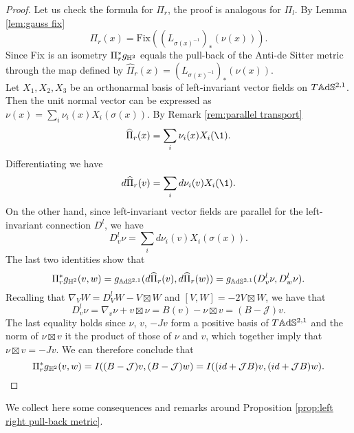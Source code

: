\begin{proof}
    Let us check the formula for $\Pi_r$, the proof is analogous for $\Pi_l$. By Lemma \ref{lem:gauss fix}
    \[
        \Pi_r(x) = \text{Fix}((L_{\sigma(x)^{-1}})_*(\nu(x))).
    \]
    Since Fix is an isometry $\Pi^*_r g_{\mathbb{H}^2}$ equals the pull-back of the Anti-de Sitter metric through the map defined by $\widehat{\Pi}_r(x) = (L_{\sigma(x)^{-1}})_*(\nu(x))$.\\
    Let $X_1, X_2, X_3$ be an orthonarmal basis of left-invariant vector fields on $T\mathbb{A}\mathrm{d}\mathbb{S}^{2,1}$. Then the unit normal vector can be expressed as $\nu(x) = \sum_i \nu_i(x) X_i (\sigma(x))$. By Remark \ref{rem:parallel transport}
    \[
        \widehat{\Pi}_r(x) = \sum_i \nu_i(x) X_i (\1).
    \]
    Differentiating we have
    \[
        d \widehat{\Pi}_r(v) = \sum_i  d \nu_i(v) X_i (\1).
    \]
    On the other hand, since left-invariant vector fields are parallel for the left-invariant connection $D^l$, we have
    \[
        D^l_v \nu = \sum_i  d \nu_i(v) X_i (\sigma(x)).
    \]
    The last two identities show that
    \[
        \Pi_r^* g_{\mathbb{H}^2}(v,w) = g_{\mathbb{A}\mathrm{d}\mathbb{S}^{2,1}}(d \widehat{\Pi}_r(v),d \widehat{\Pi}_r(w)) = g_{\mathbb{A}\mathrm{d}\mathbb{S}^{2,1}} (D^l_v \nu, D^l_w \nu).
    \]
    Recalling that $\nabla_V W = D^l_V W - V \boxtimes W$ and $\left[ V,W \right] = -2 V \boxtimes W$, we have that
    \[
        D^l_v \nu = \nabla_v \nu + v \boxtimes \nu = B(v) - \nu \boxtimes v = (B- \mathcal{J})v.
    \]
    The last equality holds since $\nu$, $v$, $-Jv$ form a positive basis of $T\mathbb{A}\mathrm{d}\mathbb{S}^{2,1}$ and the norm of $\nu \boxtimes v$ it the product of those of $\nu$ and $v$, which together imply that $\nu \boxtimes v = -Jv$.
    We can therefore conclude that
    \[
        \Pi_r^* g_{\mathbb{H}^2}(v,w) = I ((B - \mathcal{J})v, (B - \mathcal{J})w) = I((id + \mathcal{J}B)v, (id + \mathcal{J}B)w).
    \]
\end{proof}
We collect here some consequences and remarks around Proposition \ref{prop:left right pull-back metric}.
